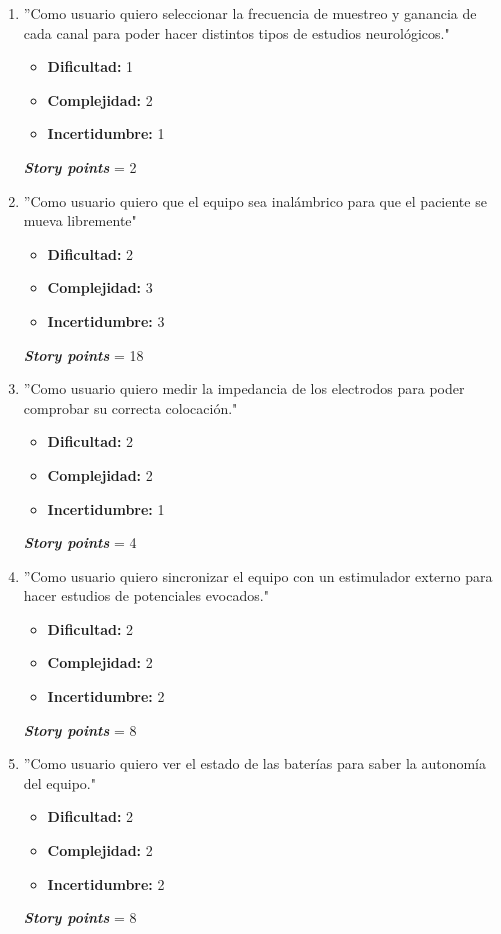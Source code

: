 \documentclass[
11pt, %
codirector, %
]{charter}
\begin{document}
	\begin{enumerate}
		\item ''Como usuario quiero seleccionar la frecuencia de muestreo y ganancia de cada canal para poder hacer distintos tipos de estudios neurológicos."
		\begin{itemize}
			\item \textbf{Dificultad:} 1
			\item \textbf{Complejidad:} 2
			\item \textbf{Incertidumbre:} 1
		\end{itemize}	
	\textbf{\textit{Story points}} = 2

		\item ''Como usuario quiero que el equipo sea inalámbrico para que el paciente se mueva libremente"
		\begin{itemize}
			\item \textbf{Dificultad:} 2
			\item \textbf{Complejidad:} 3
			\item \textbf{Incertidumbre:} 3
		\end{itemize}	
	\textbf{\textit{Story points}} = 18

		\item ''Como usuario quiero medir la impedancia de los electrodos para poder comprobar su correcta colocación."
		\begin{itemize}
			\item \textbf{Dificultad:} 2
			\item \textbf{Complejidad:} 2
			\item \textbf{Incertidumbre:} 1
		\end{itemize}	
	\textbf{\textit{Story points}} = 4

		\item ''Como usuario quiero sincronizar el equipo con un estimulador externo para hacer estudios de potenciales evocados."
		\begin{itemize}
			\item \textbf{Dificultad:} 2
			\item \textbf{Complejidad:} 2
			\item \textbf{Incertidumbre:} 2
		\end{itemize}	
	\textbf{\textit{Story points}} = 8

		\item ''Como usuario quiero ver el estado de las baterías para saber la autonomía del equipo."
		\begin{itemize}
			\item \textbf{Dificultad:} 2
			\item \textbf{Complejidad:} 2
			\item \textbf{Incertidumbre:} 2
		\end{itemize}	
	\textbf{\textit{Story points}} = 8
	\end{enumerate}
\end{document}
